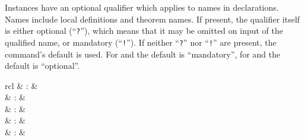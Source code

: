\begin{isabellebody}
\begin{isamarkuptext}
  Instances have an optional qualifier which applies to names in
  declarations.  Names include local definitions and theorem names.
  If present, the qualifier itself is either optional
  (``\texttt{?}''), which means that it may be omitted on input of the
  qualified name, or mandatory (``\texttt{!}'').  If neither
  ``\texttt{?}'' nor ``\texttt{!}'' are present, the command's default
  is used.  For \hyperlink{command.interpretation}{\mbox{}} and \hyperlink{command.interpret}{\mbox{}}
  the default is ``mandatory'', for \hyperlink{command.locale}{\mbox{}} and \hyperlink{command.sublocale}{\mbox{}} the default is ``optional''.%
\end{isamarkuptext}%
\isamarkuptrue%
%
\isamarkuptrue%
%
\begin{isamarkuptext}%
\begin{matharray}{rcl}
    \hypertarget{command.locale}{\hyperlink{command.locale}{\mbox{}}} & : &  \\
    \hypertarget{command.print-locale}{\hyperlink{command.print-locale}{\mbox{}}} & : &  \\
    \hypertarget{command.print-locales}{\hyperlink{command.print-locales}{\mbox{}}} & : &  \\
    \hypertarget{method.intro-locales}{\hyperlink{method.intro-locales}{\mbox{}}} & : &  \\
    \hypertarget{method.unfold-locales}{\hyperlink{method.unfold-locales}{\mbox{}}} & : &  \\
  \end{matharray}


\end{isamarkuptext}
\end{isabellebody}
